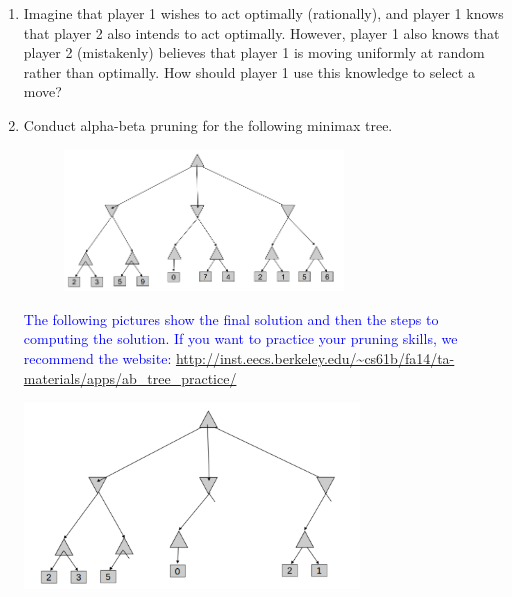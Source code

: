 \documentclass[a4paper]{article}
\newif\ifsol
\begin{document}
\begin{enumerate}
\item Imagine that player 1 wishes to act optimally (rationally), and player 1 knows that player 2 also intends to act optimally. However, player 1 also knows that player 2 (mistakenly) believes that player 1 is moving uniformly at random rather than optimally. How should player 1 use this knowledge to select a move?

\ifsol
    \textcolor{blue}{This problem can be solved by adding a second game tree. The new game tree is used to anticipate player 2's action. Here, all nodes for player 1 are replaced by chance nodes and player 1 can use expectimax to find player 2's policy. In the original game tree, player 1 can prune all actions by player 2 but the one resulting from expectimax.}
\else
    \vspace{10em}
\fi

\item Conduct alpha-beta pruning for the following minimax tree. 

\begin{figure}[h]
\centering
\includegraphics[width=0.7\textwidth]{figs/ab}
\end{figure}


\ifsol
    \textcolor{blue}{The following pictures show the final solution and then the steps to computing the solution. If you want to practice your pruning skills, we recommend the website: \url{http://inst.eecs.berkeley.edu/~cs61b/fa14/ta-materials/apps/ab_tree_practice/}}\\
    \begin{center}
        \includegraphics[width=0.7\textwidth]{figs/ab-sol}
        

\end{center}
\end{enumerate}
\end{document}
